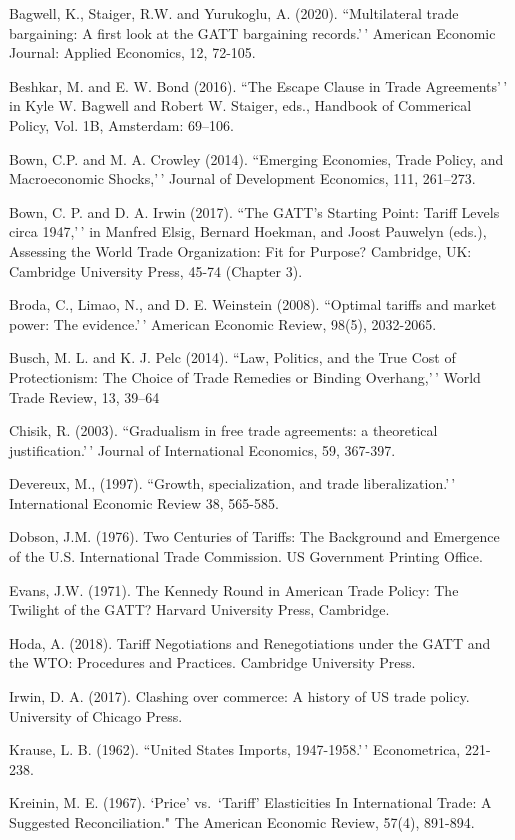 \documentclass[
  12pt,
]{article}
\begin{document}
Bagwell, K., Staiger, R.W. and Yurukoglu, A. (2020). ``Multilateral trade bargaining: A first look at the GATT bargaining records.'\,' American Economic Journal: Applied Economics, 12, 72-105.

Beshkar, M. and E. W. Bond (2016). ``The Escape Clause in Trade Agreements'\,' in Kyle W. Bagwell and Robert W. Staiger, eds., Handbook of Commerical Policy, Vol. 1B, Amsterdam: 69--106.

Bown, C.P. and M. A. Crowley (2014). ``Emerging Economies, Trade Policy, and Macroeconomic Shocks,'\,' Journal of Development Economics, 111, 261--273.

Bown, C. P. and D. A. Irwin (2017). ``The GATT's Starting Point: Tariff Levels circa 1947,'\,' in Manfred Elsig, Bernard Hoekman, and Joost Pauwelyn (eds.), Assessing the World Trade Organization: Fit for Purpose? Cambridge, UK: Cambridge University Press, 45-74 (Chapter 3).

Broda, C., Limao, N., and D. E. Weinstein (2008). ``Optimal tariffs and market power: The
evidence.'\,' American Economic Review, 98(5), 2032-2065.

Busch, M. L. and K. J. Pelc (2014). ``Law, Politics, and the True Cost of Protectionism: The Choice of Trade Remedies or Binding Overhang,'\,' World Trade Review, 13, 39--64

Chisik, R. (2003). ``Gradualism in free trade agreements: a theoretical justification.'\,' Journal of International Economics, 59, 367-397.

Devereux, M., (1997). ``Growth, specialization, and trade liberalization.'\,' International Economic Review
38, 565-585.

Dobson, J.M. (1976). Two Centuries of Tariffs: The Background and Emergence of the U.S. International Trade Commission. US Government Printing Office.

Evans, J.W. (1971). The Kennedy Round in American Trade Policy: The Twilight of the GATT? Harvard University Press, Cambridge.

Hoda, A. (2018). Tariff Negotiations and Renegotiations under the GATT and the WTO: Procedures and Practices. Cambridge University Press.

Irwin, D. A. (2017). Clashing over commerce: A history of US trade policy. University of Chicago Press.

Krause, L. B. (1962). ``United States Imports, 1947-1958.'\,' Econometrica, 221-238.

Kreinin, M. E. (1967). `\texttt{}Price' vs.~`Tariff' Elasticities In International Trade: A Suggested Reconciliation." The American Economic Review, 57(4), 891-894.
\end{document}
